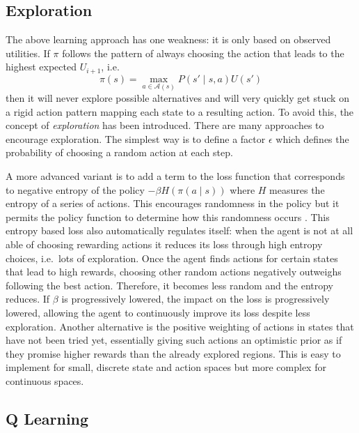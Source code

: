 \subsection{Exploration}%
\label{sub:exploration}

The above learning approach has one weakness: it is only based on observed utilities. If $\pi$ follows the pattern of
always choosing the action that leads to the highest expected $U_{i+1}$, i.e.\
\begin{equation}
    \pi(s) = \max_{a \in \mathcal{A}(s)}P(s' \mid s, a)U(s')
\end{equation}
then it will never explore possible alternatives and will very quickly get stuck on a rigid action
pattern mapping each state to a resulting action. To avoid this, the concept of \emph{exploration} has been introduced.
There are many approaches to encourage exploration. The simplest way is to define a factor $\epsilon$ which defines the
probability of choosing a random action at each step.

A more advanced variant is to add a term to the loss function that corresponds to negative entropy of the policy $-\beta
H(\pi(a \mid s ))$ where $H$ measures the entropy of a series of actions. This encourages randomness in the policy but
it permits the policy function to determine how this randomness occurs \citep{schmitt2018kickstarting}. This
entropy based loss also automatically regulates itself: when the agent is not at all able of choosing rewarding actions
it reduces its loss through high entropy choices, i.e.\ lots of exploration. Once the agent finds actions for certain
states that lead to high rewards, choosing other random actions negatively outweighs following the best action.
Therefore, it becomes less random and the entropy reduces. If $\beta$ is progressively lowered, the impact on the loss
is progressively lowered, allowing the agent to continuously improve its loss despite less exploration.
Another alternative is the positive weighting of actions in states that have not been tried yet, essentially giving such
actions an optimistic prior as if they promise higher rewards than the already explored regions. This is easy to
implement for small, discrete state and action spaces but more complex for continuous spaces.



\subsection{Q Learning}%
\label{sub:q_learning}

